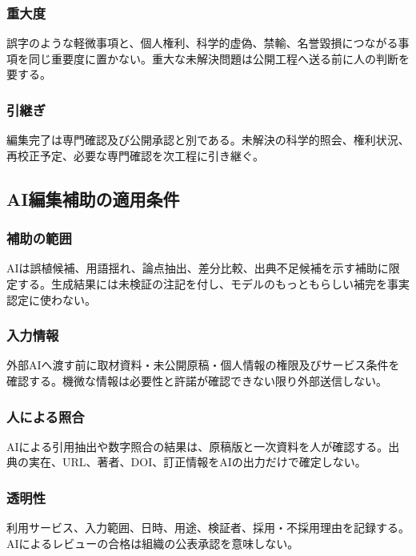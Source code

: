 \documentclass[a4paper,11pt]{article}
\begin{document}
\subsubsection{重大度}
\par 誤字のような軽微事項と、個人権利、科学的虚偽、禁輸、名誉毀損につながる事項を同じ重要度に置かない。重大な未解決問題は公開工程へ送る前に人の判断を要する。\par\medskip
\subsubsection{引継ぎ}
\par 編集完了は専門確認及び公開承認と別である。未解決の科学的照会、権利状況、再校正予定、必要な専門確認を次工程に引き継ぐ。\par\medskip
\subsection{AI編集補助の適用条件}
\subsubsection{補助の範囲}
\par AIは誤植候補、用語揺れ、論点抽出、差分比較、出典不足候補を示す補助に限定する。生成結果には未検証の注記を付し、モデルのもっともらしい補完を事実認定に使わない。\par\medskip
\subsubsection{入力情報}
\par 外部AIへ渡す前に取材資料・未公開原稿・個人情報の権限及びサービス条件を確認する。機微な情報は必要性と許諾が確認できない限り外部送信しない。\par\medskip
\subsubsection{人による照合}
\par AIによる引用抽出や数字照合の結果は、原稿版と一次資料を人が確認する。出典の実在、URL、著者、DOI、訂正情報をAIの出力だけで確定しない。\par\medskip
\subsubsection{透明性}
\par 利用サービス、入力範囲、日時、用途、検証者、採用・不採用理由を記録する。AIによるレビューの合格は組織の公表承認を意味しない。\par\medskip
\end{document}
